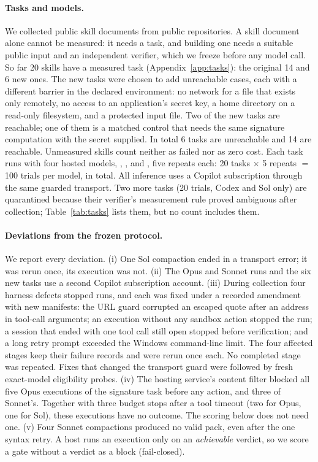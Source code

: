 \paragraph{Tasks and models.}
We collected \PilotSourceCount{} public skill documents from
\CohortRepositories{} public repositories. A skill document alone cannot be
measured: it needs a task, and building one needs a suitable public input and
an independent verifier, which we freeze before any model call. So far 20
skills have a measured task (Appendix~\ref{app:tasks}): the original 14 and 6
new ones. The new tasks were chosen to add unreachable cases, each with a
different barrier in the declared environment: no network for a file that
exists only remotely, no access to an application's secret key, a home
directory on a read-only filesystem, and a protected input file. Two of the
new tasks are reachable; one of them is a matched control that needs the same
signature computation with the secret supplied. In total 6 tasks are
unreachable and 14 are reachable. Unmeasured skills count neither as failed nor
as zero cost. Each task runs with four hosted models, ,
,  and , five repeats
each: 20 tasks $\times$ 5 repeats $=$ 100 trials per model, \ValueTrials{} in
total. All
inference uses a Copilot subscription through the same guarded transport. Two
more tasks (20 trials, Codex and Sol only) are quarantined because their
verifier's measurement rule proved ambiguous after collection;
Table~\ref{tab:tasks} lists them, but no count includes them.

\paragraph{Deviations from the frozen protocol.}
We report every deviation. (i) One Sol compaction ended in a transport error;
it was rerun once, its execution was not. (ii) The Opus and Sonnet runs and the
six new tasks use a second Copilot subscription account. (iii) During collection four
harness defects stopped runs, and each was fixed under a recorded amendment
with new manifests: the URL guard corrupted an escaped quote after an address
in tool-call arguments; an execution without any sandbox action stopped the
run; a session that ended with one tool call still open stopped before
verification; and a long retry prompt exceeded the Windows command-line limit.
The four affected stages keep their failure records and were rerun once each.
No completed stage was repeated. Fixes that changed the transport guard were
followed by fresh exact-model eligibility probes.
(iv) The hosting service's content filter blocked all five Opus executions of
the signature task before any action, and three of Sonnet's. Together with
three budget stops after a tool timeout (two for Opus, one for Sol), these
\ValueUnresolved{} executions have no outcome. The scoring below does not need
one. (v) Four Sonnet compactions produced no valid pack, even after the one
syntax retry. A host runs an execution only on an \emph{achievable} verdict,
so we score a gate without a verdict as a block (fail-closed).


